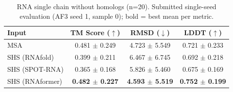 \begin{table}[htbp]
\centering
\caption{RNA single chain without homologs (n=20). Submitted single-seed evaluation (AF3 seed 1, sample 0); bold = best mean per metric.}
\label{tab:rna_single_chain_without_homologs}
\begin{tabular}{lccc}
\toprule
Input & TM Score ($\uparrow$) & RMSD ($\downarrow$) & LDDT ($\uparrow$) \\
\midrule
MSA & 0.481 $\pm$ 0.249 & 4.723 $\pm$ 5.549 & 0.721 $\pm$ 0.233 \\
SHS (RNAfold) & 0.399 $\pm$ 0.211 & 6.467 $\pm$ 6.745 & 0.692 $\pm$ 0.218 \\
SHS (SPOT-RNA) & 0.365 $\pm$ 0.168 & 5.826 $\pm$ 5.460 & 0.675 $\pm$ 0.169 \\
SHS (RNAformer) & \textbf{0.482 $\pm$ 0.227} & \textbf{4.593 $\pm$ 5.519} & \textbf{0.752 $\pm$ 0.199} \\
\bottomrule
\end{tabular}
\end{table}
